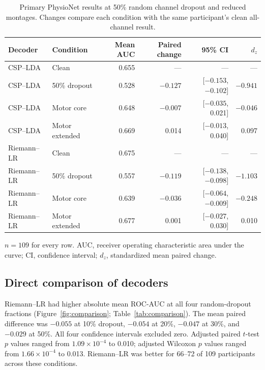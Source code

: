 \documentclass[11pt]{article}
\begin{document}
\begin{table}[t]
\centering
\caption{Primary PhysioNet results at 50\% random channel dropout and reduced montages. Changes compare each condition with the same participant's clean all-channel result.}
\label{tab:main}
\begin{threeparttable}
\small
\begin{tabular}{llrrrr}
\toprule
Decoder & Condition & Mean AUC & Paired change & 95\% CI & $d_z$ \\
\midrule
CSP--LDA & Clean & 0.655 & --- & --- & --- \\
CSP--LDA & 50\% dropout & 0.528 & $-0.127$ & [$-0.153$, $-0.102$] & $-0.941$ \\
CSP--LDA & Motor core & 0.648 & $-0.007$ & [$-0.035$, 0.021] & $-0.046$ \\
CSP--LDA & Motor extended & 0.669 & 0.014 & [$-0.013$, 0.040] & 0.097 \\
\addlinespace
Riemann--LR & Clean & 0.675 & --- & --- & --- \\
Riemann--LR & 50\% dropout & 0.557 & $-0.119$ & [$-0.138$, $-0.098$] & $-1.103$ \\
Riemann--LR & Motor core & 0.639 & $-0.036$ & [$-0.064$, $-0.009$] & $-0.248$ \\
Riemann--LR & Motor extended & 0.677 & 0.001 & [$-0.027$, 0.030] & 0.010 \\
\bottomrule
\end{tabular}
\begin{tablenotes}\footnotesize
\item $n=109$ for every row. AUC, receiver operating characteristic area under the curve; CI, confidence interval; $d_z$, standardized mean paired change.
\end{tablenotes}
\end{threeparttable}
\end{table}

\subsection{Direct comparison of decoders}
Riemann--LR had higher absolute mean ROC-AUC at all four random-dropout fractions (Figure~\ref{fig:comparison}; Table~\ref{tab:comparison}). The mean paired difference was $-0.055$ at 10\% dropout, $-0.054$ at 20\%, $-0.047$ at 30\%, and $-0.029$ at 50\%. All four confidence intervals excluded zero. Adjusted paired $t$-test $p$ values ranged from $1.09\times10^{-4}$ to 0.010; adjusted Wilcoxon $p$ values ranged from $1.66\times10^{-4}$ to 0.013. Riemann--LR was better for 66--72 of 109 participants across these conditions.
\end{document}
